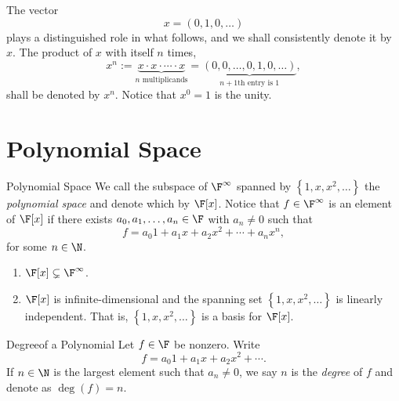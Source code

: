 \documentclass[linearalgebraII]{subfiles}
\begin{document}
    \begin{remark}
        The vector
        \begin{equation*}
            x = \left( 0, 1, 0, \ldots \right)
        \end{equation*}
        plays a distinguished role in what follows, and we shall consistently denote it by $x$. The product of $x$ with itself $n$ times,
        \begin{equation*}
            x^n := \underbrace{x\cdot x\cdot\cdots\cdot x}_{n\text{ multiplicands}} = \underbrace{\left( 0, 0, \ldots, 0, 1, 0, \ldots \right)}_{n+1\text{th entry is }1}, 
        \end{equation*}
        shall be denoted by $x^n$. Notice that $x^0 = 1$ is the unity. 
    \end{remark}

    \section{Polynomial Space}

    \begin{definition}{Polynomial Space}{}
        We call the subspace of $\F^\infty$ spanned by $\left\lbrace 1, x, x^2, \ldots \right\rbrace$ the \emph{polynomial space} and denote which by $\F[x]$. Notice that $f\in \F^\infty$ is an element of $\F[x]$ if there exists $a_0, a_1, \ldots, a_n\in \F$ with $a_n\neq 0$ such that
        \begin{equation*}
            f = a_0 1+ a_1x+ a_2x^2 + \cdots + a_nx^n,
        \end{equation*}
        for some $n\in \N$.
    \end{definition}

    \begin{remark}
        \begin{enumerate}
            \item $\F[x]\subsetneq \F^\infty$.
            \item $\F[x]$ is infinite-dimensional and the spanning set $\left\lbrace 1, x, x^2, \ldots \right\rbrace$ is linearly independent. That is, $\left\lbrace 1, x, x^2, \ldots \right\rbrace$ is a basis for $\F[x]$.
        \end{enumerate}
    \end{remark}

    \begin{definition}{Degree}{of a Polynomial}
        Let $f\in \F$ be nonzero. Write
        \begin{equation*}
            f = a_0 1 + a_1x + a_2x^2 + \cdots.
        \end{equation*}
        If $n\in \N$ is the largest element such that $a_n\neq 0$, we say $n$ is the \emph{degree} of $f$ and denote as $\deg(f) = n$.
    \end{definition}
\end{document}
